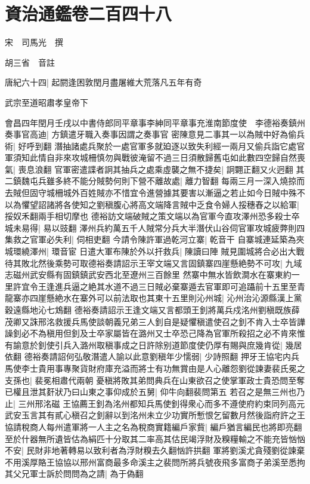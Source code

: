 \chapter{資治通鑑卷二百四十八}
宋　司馬光　撰

胡三省　音註

唐紀六十四|{
	起閼逢困敦閏月盡屠維大荒落凡五年有奇}


武宗至道昭肅孝皇帝下

會昌四年閏月壬戌以中書侍郎同平章事李紳同平章事充淮南節度使　李德裕奏鎮州奏事官高迪|{
	方鎮遣牙職入奏事因謂之奏事官}
密陳意見二事其一以為賊中好為偷兵術|{
	好呼到翻}
潛抽諸處兵聚於一處官軍多就廹逐以致失利經一兩月又偷兵詣它處官軍須知此情自非來攻城柵慎勿與戰彼淹留不過三日須散歸舊屯如此數四空歸自然喪氣|{
	喪息浪翻}
官軍密遣諜者詗其抽兵之處乘虛襲之無不捷矣|{
	詗翾正翻又火迥翻}
其二鎮魏屯兵雖多終不能分賊勢何則下營不離故處|{
	離力智翻}
每兩三月一深入燒掠而去賊但固守城柵城外百姓賊亦不惜宜令進營據其要害以漸逼之若止如今日賊中殊不以為懼望詔諸將各使知之劉稹腹心將高文端降言賊中乏食令婦人挼穗舂之以給軍|{
	挼奴禾翻兩手相切摩也}
德裕訪文端破賊之策文端以為官軍今直攻澤州恐多殺士卒城未易得|{
	易以豉翻}
澤州兵約萬五千人賊常分兵大半潛伏山谷伺官軍攻城疲弊則四集救之官軍必失利|{
	伺相吏翻}
今請令陳許軍過乾河立寨|{
	乾音干}
自寨城連延築為夾城環繞澤州|{
	環音宦}
日遣大軍布陳於外以扞救兵|{
	陳讀曰陣}
賊見圍城將合必出大戰待其敗北然後乘勢可取德裕奏請詔示王宰文端又言固鎮寨四崖懸絶勢不可攻|{
	九域志磁州武安縣有固鎮鎮武安西北至遼州三百餘里}
然寨中無水皆飲澗水在寨東約一里許宜令王逢進兵逼之絶其水道不過三日賊必棄寨遁去官軍即可追躡前十五里至青龍寨亦四崖懸絶水在寨外可以前法取也其東十五里則沁州城|{
	沁州治沁源縣漢上黨穀遠縣地沁七鴆翻}
德裕奏請詔示王逢文端又言都頭王釗將萬兵戍洺州劉稹既族薛茂卿又誅邢洺救援兵馬使談朝義兄弟三人釗自是疑懼稹遣使召之釗不肯入士卒皆譁譟釗必不為稹用但釗及士卒家屬皆在潞州又士卒恐己降為官軍所殺招之必不肯來惟有諭意於釗使引兵入潞州取稹事成之日許除别道節度使仍厚有賜與庶幾肯從|{
	幾居依翻}
德裕奏請詔何弘敬潛遣人諭以此意劉稹年少懦弱|{
	少詩照翻}
押牙王協宅内兵馬使李士貴用事專聚貨財府庫充溢而將士有功無賞由是人心離怨劉從諫妻裴氏冕之支孫也|{
	裴冕相肅代兩朝}
憂稹將敗其弟問典兵在山東欲召之使掌軍政士貴恐問至奪已權且泄其姧狀乃曰山東之事仰成於五舅|{
	仰牛向翻裴問第五}
若召之是無三州也乃止|{
	三州邢洺磁}
王協薦王釗為洺州都知兵馬使釗得衆心而多不遵使府約束同列高元武安玉言其有貳心稹召之釗辭以到洺州未立少功實所慙恨乞留數月然後詣府許之王協請稅商人每州遣軍將一人主之名為稅商實籍編戶家貲|{
	編戶猶言編民也將即亮翻}
至於什器無所遺皆估為絹匹十分取其二率高其估民竭浮財及糗糧輸之不能充皆忷忷不安|{
	民財非地著轉易以致利者為浮財糗去久翻忷許拱翻}
軍將劉溪尤貪殘劉從諫棄不用溪厚賂王協協以邢州富商最多命溪主之裴問所將兵號夜飛多富商子弟溪至悉拘其父兄軍士訴於問問為之請|{
	為于偽翻}
